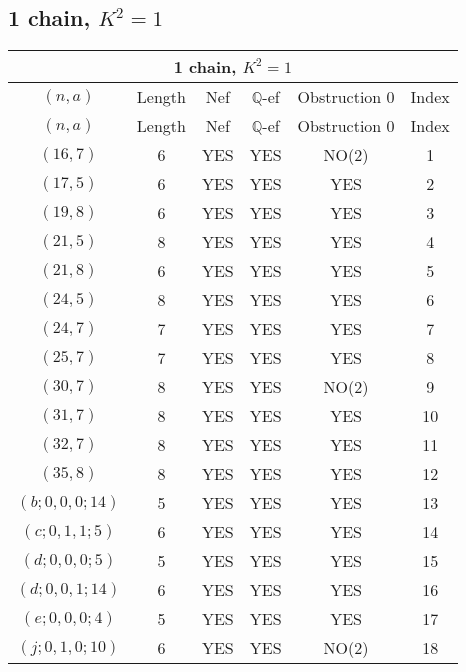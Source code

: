 \subsection{1 chain, $K^2 = 1$}
\begin{longtable}{|c|c|c|c|c|c|}
\hline
\multicolumn{6}{|c|}{1 chain, $K^2 = 1$}\\
\hline
$(n,a)$ & Length & Nef & $\mathbb Q$-ef & Obstruction 0 & Index\\
\hline
\endfirsthead

\hline
$(n,a)$ & Length & Nef & $\mathbb Q$-ef & Obstruction 0 & Index\\
\hline
\endhead
\hline
\endfoot

$(16, 7)$ & 6 & YES & YES & NO(2) & 1\\
$(17, 5)$ & 6 & YES & YES & YES & 2\\
$(19, 8)$ & 6 & YES & YES & YES & 3\\
$(21, 5)$ & 8 & YES & YES & YES & 4\\
$(21, 8)$ & 6 & YES & YES & YES & 5\\
$(24, 5)$ & 8 & YES & YES & YES & 6\\
$(24, 7)$ & 7 & YES & YES & YES & 7\\
$(25, 7)$ & 7 & YES & YES & YES & 8\\
$(30, 7)$ & 8 & YES & YES & NO(2) & 9\\
$(31, 7)$ & 8 & YES & YES & YES & 10\\
$(32, 7)$ & 8 & YES & YES & YES & 11\\
$(35, 8)$ & 8 & YES & YES & YES & 12\\
$(b; 0, 0, 0; 14)$ & 5 & YES & YES & YES & 13\\
$(c; 0, 1, 1; 5)$ & 6 & YES & YES & YES & 14\\
$(d; 0, 0, 0; 5)$ & 5 & YES & YES & YES & 15\\
$(d; 0, 0, 1; 14)$ & 6 & YES & YES & YES & 16\\
$(e; 0, 0, 0; 4)$ & 5 & YES & YES & YES & 17\\
$(j; 0, 1, 0; 10)$ & 6 & YES & YES & NO(2) & 18
\end{longtable}
